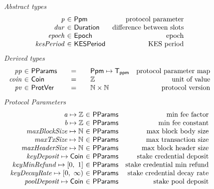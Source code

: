 \begin{figure*}[htb]
  \emph{Abstract types}
  \begin{equation*}
    \begin{array}{r@{~\in~}lr}
      \var{p} & \Ppm & \text{protocol parameter}\\
      \var{dur} & \Duration & \text{difference between slots}\\
      \var{epoch} & \Epoch & \text{epoch} \\
      \var{kesPeriod} & \KESPeriod & \text{KES period} \\
    \end{array}
  \end{equation*}
  \emph{Derived types}
  \begin{equation*}
    \begin{array}{r@{~\in~}l@{\qquad=\qquad}lr}
      \var{pp}
      & \PParams
      & \Ppm \mapsto \mathsf{T_{ppm}}
      & \text{protocol parameter map}
      \\
      \var{coin}
      & \Coin
      & \Z
      & \text{unit of value}
      \\
      \var{pv}
      & \ProtVer
      & \N\times\N
      & \text{protocol version}
    \end{array}
  \end{equation*}
  \emph{Protocol Parameters}
  \begin{equation*}
      \begin{array}{r@{~\in~}lr}
        \var{a} \mapsto \Z & \PParams & \text{min fee factor}\\
        \var{b} \mapsto \Z & \PParams & \text{min fee constant}\\
        \var{maxBlockSize} \mapsto \N & \PParams & \text{max block body size}\\
        \var{maxTxSize} \mapsto \N & \PParams & \text{max transaction size}\\
        \var{maxHeaderSize} \mapsto \N & \PParams & \text{max block header size}\\
        \var{keyDeposit} \mapsto \Coin & \PParams & \text{stake credential deposit}\\
        \var{keyMinRefund} \mapsto \unitInterval & \PParams & \text{stake credential min refund}\\
        \var{keyDecayRate} \mapsto \nonnegReals & \PParams & \text{stake credential decay rate}\\
        \var{poolDeposit} \mapsto \Coin & \PParams & \text{stake pool deposit}\\

\end{array}
\end{equation*}
\end{figure*}
